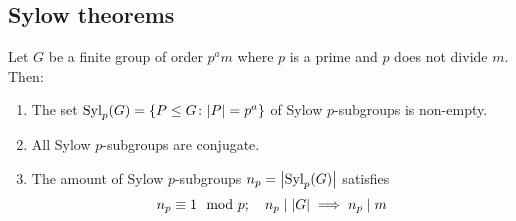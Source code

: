 \subsection{Sylow theorems}
\begin{theorem}
	Let \( G \) be a finite group of order \( p^a m \) where \( p \) is a prime and \( p \) does not divide \( m \).
	Then:
	\begin{enumerate}
		\item The set \( \mathrm{Syl}_p(G) = \qty{P \leq G \colon \abs{P} = p^a} \) of Sylow \( p \)-subgroups is non-empty.
		\item All Sylow \( p \)-subgroups are conjugate.
		\item The amount of Sylow \( p \)-subgroups \( n_p = \abs{\mathrm{Syl}_p(G)} \) satisfies
		      \[
			      n_p \equiv 1 \mod p;\quad n_p \mid \abs{G} \implies n_p \mid m
		      \]
	\end{enumerate}
\end{theorem}
